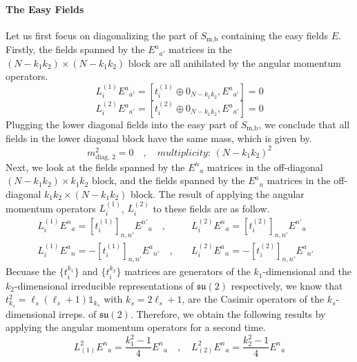 \paragraph{The Easy Fields}
Let us first focus on diagonalizing the part of $S_{\text{m,b}}$ containing the easy fields $E$. Firstly, the fields spanned by the ${E^a}_{a'}$ matrices in the $(N - k_1 k_2) \times (N - k_1 k_2)$ block are all anihilated by the angular momentum operators.
%
%
\begin{equation}
L_i^{(1)} {E^a}_{a'}
=
[t^{(1)}_i \oplus 0_{N - k_1 k_2}, {E^a}_{a'}]
=
0
\end{equation}
%
%
\begin{equation}
L_i^{(2)} {E^a}_{a'}
=
[t^{(2)}_i \oplus 0_{N - k_1 k_2}, {E^a}_{a'}]
=
0
\end{equation}
%
%
Plugging the lower diagonal fields into the easy part of $S_{\text{m,b}}$, we conclude that all fields in the lower diagonal block have the same mass, which is given by.
%
%
\begin{equation}
m^2_{\text{diag. 2}} = 0
%
\quad , \quad
%
\textit{multiplicity: } (N - k_1 k_2)^2
\end{equation}
%
%
Next, we look at the fields spanned by the ${E^n}_a$ matrices in the off-diagonal $(N - k_1 k_2) \times k_1 k_2$ block, and the fields spanned by the ${E^a}_n$ matrices in the off-diagonal $k_1 k_2 \times (N - k_1 k_2)$ block. The result of applying the angular momentum operators $L_i^{(1)}$, $L_i^{(2)}$ to these fields are as follow.
%
%
\begin{align}
L_i^{(1)} {E^n}_a
=
[t^{(1)}_i]_{n,n'} {E^{n'}}_a
%
\quad , & \quad
%
L_i^{(2)} {E^n}_a
=
[t^{(2)}_i]_{n,n'} {E^{n'}}_a
\\
L_i^{(1)} {E^a}_n
=
-[t^{(1)}_i]_{n,n'} {E^a}_{n'}
%
\quad , & \quad
%
L_i^{(2)} {E^a}_n
=
-[t^{(2)}_i]_{n,n'} {E^a}_{n'} &
\end{align}
%
%
Becuase the $\{ t_i^{k_1} \}$ and $\{ t_i^{k_2} \}$ matrices are generators of the $k_1$-dimensional and the $k_2$-dimensional irreducible representations of $\mathfrak{su}(2)$ respectively, we know that $t^2_{k_s} = \ell_s (\ell_s + 1) \mathbb{1}_{k_s}$ with $k_s = 2 \ell_s + 1$, are the Casimir operators of the $k_s$-dimensional irreps. of $\mathfrak{su}(2)$. Therefore, we obtain the following results by applying the angular momentum operators for a second time.
%
%
\begin{equation}
L_{(1)}^2 {E^n}_a
=
\frac{k_1^2 - 1}{4}
{E^n}_a
%
\quad , \quad
%
L_{(2)}^2 {E^n}_a
=
\frac{k_2^2 - 1}{4}
{E^n}_a
\end{equation}
